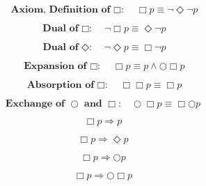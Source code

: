 \documentclass[fleqn, leqno]{article}
\newcommand{\next}{\bigcirc}
\newcommand{\event}{\Diamond}
\newcommand{\always}{\Box}
\newcommand{\spacer}{\vspace{-30pt}}
\begin{document}
\spacer

\begin{equation}\label{E:defAlways}
\textbf{Axiom, Definition of $\always$:}\quad \always p \equiv \lnot\event\lnot p
\end{equation}

\spacer

\begin{equation}\label{E:dualAlways}
\textbf{Dual of $\always$:}\quad \lnot\always p \equiv \event\lnot p
\end{equation}

\spacer

\begin{equation}\label{E:dualEvent}
\textbf{Dual of $\event$:}\quad \lnot\event p \equiv \always\lnot p
\end{equation}

\spacer

\begin{equation}\label{E:expansionAlways}
\textbf{Expansion of $\always$:}\quad \always p \equiv p \land \next\always p
\end{equation}

\pagebreak

\begin{equation}\label{E:IdemAlways}
\textbf{Absorption of $\always$:}\quad \always\always p \equiv \always p
\end{equation}

\spacer

\begin{equation}\label{E:dNextAlways}
\textbf{Exchange of $\next$ and $\always$:}\quad \next\always p \equiv \always\next p
\end{equation}

\spacer

\begin{equation}\label{E:impAlways}
\always p \Rightarrow p
\end{equation}

\spacer

\begin{equation}\label{E:impAlwaysE}
\always p \Rightarrow \event p
\end{equation}

\spacer

\begin{equation}\label{E:impAlwaysN}
\always p \Rightarrow \next p
\end{equation}

\spacer

\begin{equation}\label{E:impAlwaysNA}
\always p \Rightarrow \next\always p
\end{equation}
\end{document}
